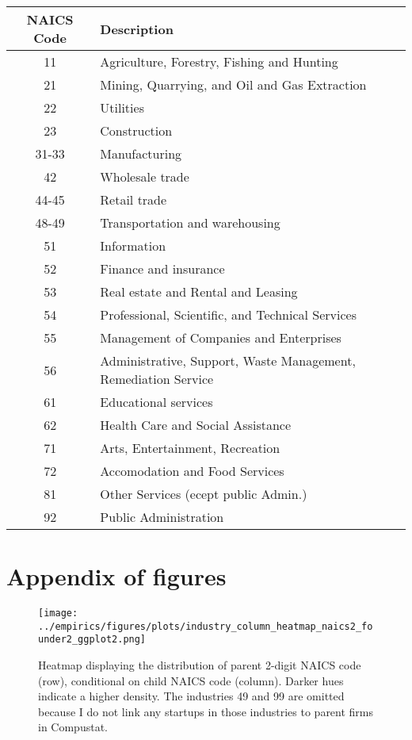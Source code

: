 \documentclass[11pt,english]{article}
\theoremstyle{definition}
\begin{document}
\begin{table}[]
	\small
	\centering
	\begin{tabular}{cl}
		\toprule \toprule
		NAICS Code & Description \tabularnewline
		\midrule
		11  & Agriculture, Forestry, Fishing and Hunting \tabularnewline
		21  & Mining, Quarrying, and Oil and Gas Extraction\tabularnewline
		22  & Utilities\tabularnewline
		23  & Construction \tabularnewline
		31-33 & Manufacturing \tabularnewline
		42 & Wholesale trade \tabularnewline
		44-45 & Retail trade \tabularnewline
		48-49 & Transportation and warehousing \tabularnewline
		51 & Information \tabularnewline
		52 & Finance and insurance \tabularnewline
		53 & Real estate and Rental and Leasing \tabularnewline
		54 & Professional, Scientific, and Technical Services \tabularnewline
		55 & Management of Companies and Enterprises \tabularnewline
		56 & Administrative, Support, Waste Management, Remediation Service \tabularnewline
		61 & Educational services \tabularnewline
		62 & Health Care and Social Assistance \tabularnewline
		71 & Arts, Entertainment, Recreation \tabularnewline
		72 & Accomodation and Food Services \tabularnewline
		81 & Other Services (ecept public Admin.) \tabularnewline
		92 & Public Administration\tabularnewline
		\bottomrule
	\end{tabular}
	\label{naics2_codes}	
\end{table}





\newpage
\section{Appendix of figures}

\setcounter{figure}{0}
\renewcommand{\thefigure}{\Alph{section}\arabic{figure}}

\begin{figure}[!htb]
	\centering
	\texttt{[image: ../empirics/figures/plots/industry\_column\_heatmap\_naics2\_founder2\_ggplot2.png]}
	\caption{Heatmap displaying the distribution of parent 2-digit NAICS code (row), conditional on child NAICS code (column). Darker hues indicate a higher density. The industries 49 and 99 are omitted because I do not link any startups in those industries to parent firms in Compustat.}
	\label{figure:industry_column_heatmap_naics2_founder2}
\end{figure}
\end{document}
